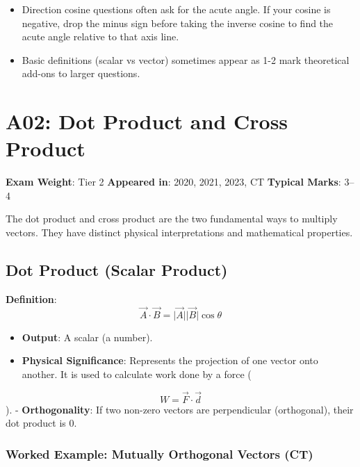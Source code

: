 \documentclass[
]{article}
\providecommand{\tightlist}{%
  \setlength{\itemsep}{0pt}\setlength{\parskip}{0pt}}
\renewenvironment{quote}
  {\begin{tcolorbox}[
     colback=calloutbg,
     colframe=calloutframe,
     colupper=callouttext,
     arc=3pt,
     boxrule=0.5pt,
     leftrule=0.5pt,
     borderline west={3pt}{0pt}{calloutaccent},
     left=8pt,
     right=8pt,
     top=6pt,
     bottom=6pt
   ]}
  {\end{tcolorbox}}
\begin{document}
\begin{itemize}
\tightlist
\item
  Direction cosine questions often ask for the acute angle. If your
  cosine is negative, drop the minus sign before taking the inverse
  cosine to find the acute angle relative to that axis line.
\item
  Basic definitions (scalar vs vector) sometimes appear as 1-2 mark
  theoretical add-ons to larger questions.
\end{itemize}

\section{A02: Dot Product and Cross
Product}\label{a02-dot-product-and-cross-product}

\begin{quote}
\textbf{Exam Weight}: Tier 2 \textbar{} \textbf{Appeared in}: 2020,
2021, 2023, CT \textbar{} \textbf{Typical Marks}: 3--4
\end{quote}

The dot product and cross product are the two fundamental ways to
multiply vectors. They have distinct physical interpretations and
mathematical properties.

\subsection{Dot Product (Scalar
Product)}\label{dot-product-scalar-product}

\textbf{Definition}:
\[
\vec{A} \cdot \vec{B} = \lvert \vec{A} \rvert\lvert \vec{B} \rvert\cos\theta
\]
\begin{itemize}
\tightlist
\item
  \textbf{Output}: A scalar (a number).
\item
  \textbf{Physical Significance}: Represents the projection of one
  vector onto another. It is used to calculate work done by a force (
\end{itemize}
\[
W = \vec{F} \cdot \vec{d}
\]
). - \textbf{Orthogonality}: If two non-zero vectors are perpendicular
(orthogonal), their dot product is 0.

\subsubsection{Worked Example: Mutually Orthogonal Vectors
(CT)}\label{worked-example-mutually-orthogonal-vectors-ct}
\end{document}
